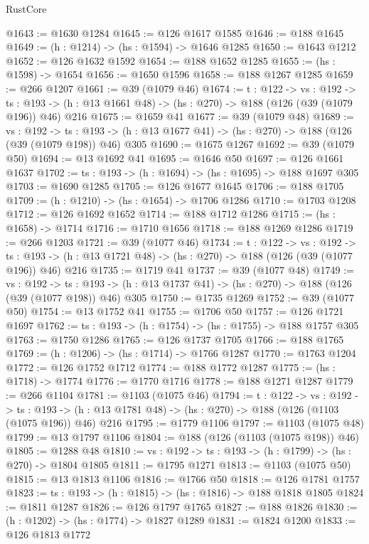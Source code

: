 \begin{lexlean}{RustCore}
\begin{coremodule}
@1643 := @1630 @1284
@1645 := @126 @1617 @1585
@1646 := @188 @1645
@1649 := (h : @1214) -> (hs : @1594) -> @1646 @1285
@1650 := @1643 @1212
@1652 := @126 @1632 @1592
@1654 := @188 @1652 @1285
@1655 := (hs : @1598) -> @1654
@1656 := @1650 @1596
@1658 := @188 @1267 @1285
@1659 := @266 @1207
@1661 := @39 (@1079 @46)
@1674 := {t : @122} ->
  {vs : @192} ->
  {ts : @193} -> (h : @13 @1661 @48) -> (hs : @270) -> @188 (@126 (@39 (@1079 @196)) @46) @216
@1675 := @1659 @41
@1677 := @39 (@1079 @48)
@1689 := {vs : @192} ->
  {ts : @193} -> (h : @13 @1677 @41) -> (hs : @270) -> @188 (@126 (@39 (@1079 @198)) @46) @305
@1690 := @1675 @1267
@1692 := @39 (@1079 @50)
@1694 := @13 @1692 @41
@1695 := @1646 @50
@1697 := @126 @1661 @1637
@1702 := {ts : @193} -> (h : @1694) -> (hs : @1695) -> @188 @1697 @305
@1703 := @1690 @1285
@1705 := @126 @1677 @1645
@1706 := @188 @1705
@1709 := (h : @1210) -> (hs : @1654) -> @1706 @1286
@1710 := @1703 @1208
@1712 := @126 @1692 @1652
@1714 := @188 @1712 @1286
@1715 := (hs : @1658) -> @1714
@1716 := @1710 @1656
@1718 := @188 @1269 @1286
@1719 := @266 @1203
@1721 := @39 (@1077 @46)
@1734 := {t : @122} ->
  {vs : @192} ->
  {ts : @193} -> (h : @13 @1721 @48) -> (hs : @270) -> @188 (@126 (@39 (@1077 @196)) @46) @216
@1735 := @1719 @41
@1737 := @39 (@1077 @48)
@1749 := {vs : @192} ->
  {ts : @193} -> (h : @13 @1737 @41) -> (hs : @270) -> @188 (@126 (@39 (@1077 @198)) @46) @305
@1750 := @1735 @1269
@1752 := @39 (@1077 @50)
@1754 := @13 @1752 @41
@1755 := @1706 @50
@1757 := @126 @1721 @1697
@1762 := {ts : @193} -> (h : @1754) -> (hs : @1755) -> @188 @1757 @305
@1763 := @1750 @1286
@1765 := @126 @1737 @1705
@1766 := @188 @1765
@1769 := (h : @1206) -> (hs : @1714) -> @1766 @1287
@1770 := @1763 @1204
@1772 := @126 @1752 @1712
@1774 := @188 @1772 @1287
@1775 := (hs : @1718) -> @1774
@1776 := @1770 @1716
@1778 := @188 @1271 @1287
@1779 := @266 @1104
@1781 := @1103 (@1075 @46)
@1794 := {t : @122} ->
  {vs : @192} ->
  {ts : @193} -> (h : @13 @1781 @48) -> (hs : @270) -> @188 (@126 (@1103 (@1075 @196)) @46) @216
@1795 := @1779 @1106
@1797 := @1103 (@1075 @48)
@1799 := @13 @1797 @1106
@1804 := @188 (@126 (@1103 (@1075 @198)) @46)
@1805 := @1288 @48
@1810 := {vs : @192} -> {ts : @193} -> (h : @1799) -> (hs : @270) -> @1804 @1805
@1811 := @1795 @1271
@1813 := @1103 (@1075 @50)
@1815 := @13 @1813 @1106
@1816 := @1766 @50
@1818 := @126 @1781 @1757
@1823 := {ts : @193} -> (h : @1815) -> (hs : @1816) -> @188 @1818 @1805
@1824 := @1811 @1287
@1826 := @126 @1797 @1765
@1827 := @188 @1826
@1830 := (h : @1202) -> (hs : @1774) -> @1827 @1289
@1831 := @1824 @1200
@1833 := @126 @1813 @1772

\end{coremodule}
\end{lexlean}
